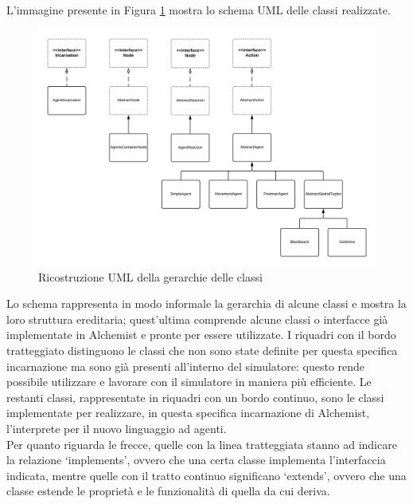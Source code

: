 L'immagine presente in Figura \ref{fig:UMLGerarchiaClassi} mostra lo schema UML delle classi realizzate.
\begin{figure}[ht] %
\includegraphics[width=15cm]{images/UML_agenti.png} %
\caption[Ricostruzione UML della gerarchia delle classi]{Ricostruzione UML della gerarchie delle classi} \label{fig:UMLGerarchiaClassi}
\end{figure}

Lo schema rappresenta in modo informale la gerarchia di alcune classi e mostra la loro struttura ereditaria; quest'ultima comprende alcune classi o interfacce già implementate in Alchemist e pronte per essere utilizzate. I riquadri con il bordo tratteggiato distinguono le classi che non sono state definite per questa specifica incarnazione ma sono già presenti all'interno del simulatore: questo rende possibile utilizzare e lavorare con il simulatore in maniera più efficiente. Le restanti classi, rappresentate in riquadri con un bordo continuo, sono le classi implementate per realizzare, in questa specifica incarnazione di Alchemist, l'interprete per il nuovo linguaggio ad agenti.
\\
Per quanto riguarda le frecce, quelle con la linea tratteggiata stanno ad indicare la relazione `implements', ovvero che una certa classe implementa l'interfaccia indicata, mentre quelle con il tratto continuo significano `extends', ovvero che una classe estende le proprietà e le funzionalità di quella da cui deriva.

